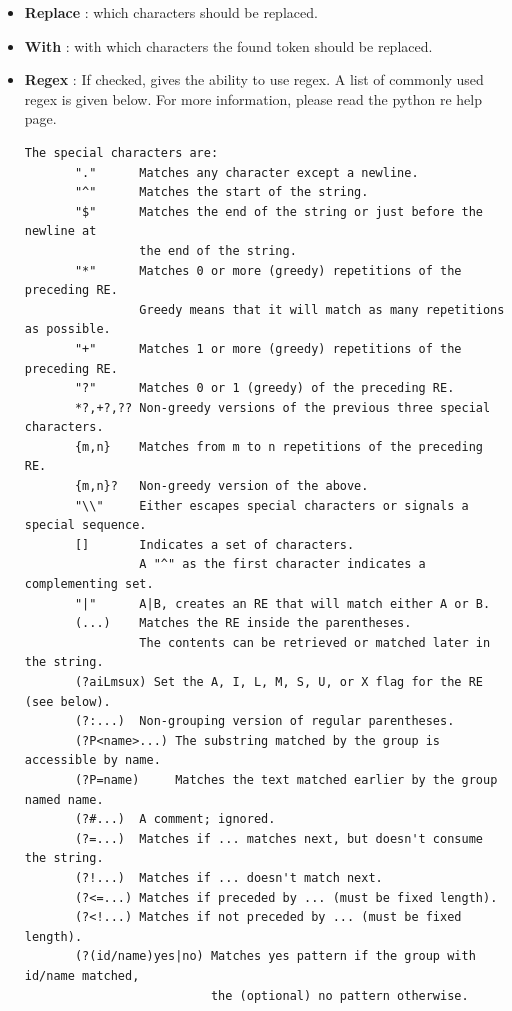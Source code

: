 \documentclass[11pt, a4paper]{scrartcl}
\begin{document}
\begin{itemize}
        \item \textbf{Replace} : which characters should be replaced.
        \item \textbf{With} : with which characters the found token should be replaced.
        \item \textbf{Regex} : If checked, gives the ability to use regex. A list of commonly used regex is given below. For more information, please read the python re help page.
                \begingroup
                \fontsize{8pt}{8pt}\selectfont
\begin{verbatim}
The special characters are:
       "."      Matches any character except a newline.
       "^"      Matches the start of the string.
       "$"      Matches the end of the string or just before the newline at
                the end of the string.
       "*"      Matches 0 or more (greedy) repetitions of the preceding RE.
                Greedy means that it will match as many repetitions as possible.
       "+"      Matches 1 or more (greedy) repetitions of the preceding RE.
       "?"      Matches 0 or 1 (greedy) of the preceding RE.
       *?,+?,?? Non-greedy versions of the previous three special characters.
       {m,n}    Matches from m to n repetitions of the preceding RE.
       {m,n}?   Non-greedy version of the above.
       "\\"     Either escapes special characters or signals a special sequence.
       []       Indicates a set of characters.
                A "^" as the first character indicates a complementing set.
       "|"      A|B, creates an RE that will match either A or B.
       (...)    Matches the RE inside the parentheses.
                The contents can be retrieved or matched later in the string.
       (?aiLmsux) Set the A, I, L, M, S, U, or X flag for the RE (see below).
       (?:...)  Non-grouping version of regular parentheses.
       (?P<name>...) The substring matched by the group is accessible by name.
       (?P=name)     Matches the text matched earlier by the group named name.
       (?#...)  A comment; ignored.
       (?=...)  Matches if ... matches next, but doesn't consume the string.
       (?!...)  Matches if ... doesn't match next.
       (?<=...) Matches if preceded by ... (must be fixed length).
       (?<!...) Matches if not preceded by ... (must be fixed length).
       (?(id/name)yes|no) Matches yes pattern if the group with id/name matched,
                          the (optional) no pattern otherwise.


\end{verbatim}
\end{itemize}
\end{document}
